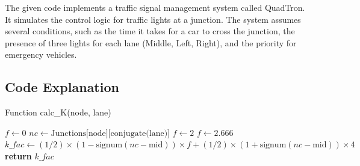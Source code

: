 \documentclass{IEEEtran}
\begin{document}
The given code implements a traffic signal management system called QuadTron. It simulates the control logic for traffic lights at a junction. The system assumes several conditions, such as the time it takes for a car to cross the junction, the presence of three lights for each lane (Middle, Left, Right), and the priority for emergency vehicles.

\subsection{Code Explanation}

\begin{algorithm}
\caption{Function calc\_K(node, lane)}
\begin{algorithmic}[1]
    \State $f \gets 0$
    \State $nc \gets \text{Junctions[node][conjugate(lane)]}$
        \State $f \gets 2$
    \Else
        \State $f \gets 2.666$
    \EndIf
    \State $k\_fac \gets (1/2) \times (1-\text{signum}(nc-\text{mid})) \times f + (1/2) \times (1+\text{signum}(nc-\text{mid})) \times 4$
    \State \textbf{return} $k\_fac$
\EndProcedure
\end{algorithmic}
\end{algorithm}
\end{document}
